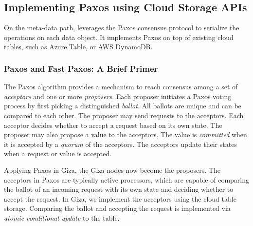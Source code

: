 
\subsection{Implementing Paxos using Cloud Storage APIs}

On the meta-data path, \name leverages the Paxos consensus protocol to serialize the operations on each data object.
It implements Paxos on top of existing cloud tables, such as Azure Table, or AWS DynamoDB.

\subsubsection{Paxos and Fast Paxos: A Brief Primer}

The Paxos algorithm provides a mechanism to reach consensus among a set of {\em acceptors} and one or more {\em proposers}. Each proposer initiates a Paxos voting process by first picking a distinguished {\em ballot}. All ballots are unique and can be compared to each other. The proposer may send requests to the acceptors. Each acceptor decides whether to accept a request based on its own state. The proposer may also propose a value to the acceptors. The value is {\em committed} when it is accepted by a {\em quorum} of the acceptors. The acceptors update their states when a request or value is accepted.

Applying Paxos in Giza, the Giza nodes now become the proposers. The acceptors in Paxos are typically active processors, which are capable of comparing the ballot of an incoming request with its own state and deciding whether to accept the request. In Giza, we implement the acceptors using the cloud table storage. Comparing the ballot and accepting the request is implemented via {\em atomic conditional update} to the table.

